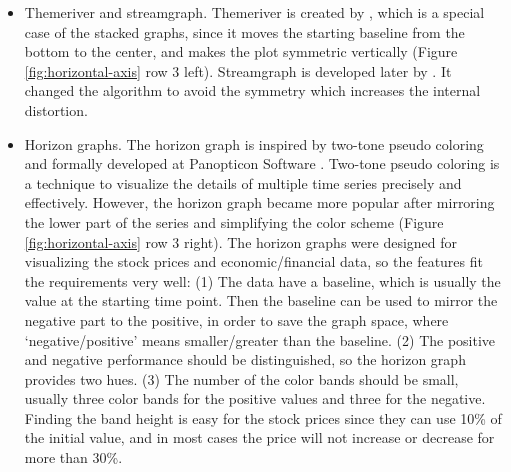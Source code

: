 \documentclass[12pt]{article}
\begin{document}
\begin{itemize}
\item Themeriver and streamgraph. Themeriver is created by \citet{havre2000themeriver},
which is a special case of the stacked graphs, since it moves the
starting baseline from the bottom to the center, and makes the plot
symmetric vertically (Figure \ref{fig:horizontal-axis} row 3 left). Streamgraph is developed later by \citet{byron2008stacked}.
It changed the algorithm to avoid the symmetry which increases the
internal distortion.

\item Horizon graphs. The horizon graph is inspired by two-tone pseudo coloring
\citep{saito2005two} and formally developed at Panopticon Software
\citep{reijner2008development}. Two-tone pseudo coloring is a technique
to visualize the details of multiple time series precisely and effectively.
However, the horizon graph became more popular after mirroring the
lower part of the series and simplifying the color scheme (Figure \ref{fig:horizontal-axis} row 3 right). The horizon
graphs were designed for visualizing the stock prices and economic/financial
data, so the features fit the requirements very well:  (1) The data
have a baseline, which is usually the value at the starting time point.
Then the baseline can be used to mirror the negative part to the positive,
in order to save the graph space, where `negative/positive' means
smaller/greater than the baseline.  (2) The positive and negative performance
should be distinguished, so the horizon graph provides two hues.  (3)
The number of the color bands should be small, usually three color
bands for the positive values and three for the negative. Finding
the band height is easy for the stock prices since they can use 10\%
of the initial value, and in most cases the price will not increase
or decrease for more than 30\%.


\end{itemize}
\end{document}
